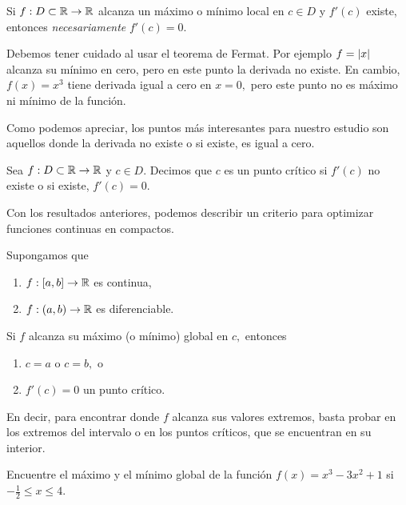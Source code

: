     \begin{thm}
        Si $f:D\subset \mathbb{R} \to \mathbb{R}$ alcanza un máximo o mínimo local en $c\in D$ y $f'(c)$ existe, entonces \emph{necesariamente}
        $f'(c)=0.$
    \end{thm}


    \begin{rem}
        Debemos tener cuidado al usar el teorema de Fermat. Por ejemplo $f=\left|x\right|$ alcanza su mínimo en cero, pero en este
        punto la derivada no existe. En cambio, $f(x)=x^{3}$ tiene derivada igual a cero en $x=0,$ pero este punto no es máximo
        ni mínimo de la función.
    \end{rem}


    Como podemos apreciar, los puntos más interesantes para nuestro estudio son aquellos donde la derivada no existe o si
    existe, es igual a cero.


    \begin{defn}
        Sea $f:D \subset \mathbb{R} \to \mathbb{R}$ y $c\in D.$ Decimos que $c$ es un punto crítico si $f'(c)$ no existe o si existe,
        $f'(c)=0.$
    \end{defn}


    Con los resultados anteriores, podemos describir un criterio para optimizar funciones continuas en compactos.


    \begin{prop}
        \label{opt:compacto}
        Supongamos que
        \begin{enumerate}
            \item $f:[a,b]\to \mathbb{R}$ es continua,
            \item $f:(a,b)\to \mathbb{R}$ es diferenciable.
        \end{enumerate}
        Si $f$ alcanza su máximo (o mínimo) global en $c,$ entonces
        \begin{enumerate}
            \item $c=a$ o $c=b,$ o
            \item $f'(c)=0$ un punto crítico.
        \end{enumerate}
    \end{prop}


    En decir, para encontrar donde $f$ alcanza sus valores extremos, basta probar en los extremos del intervalo o en los
    puntos críticos, que se encuentran en su interior.


    \begin{problema}
        Encuentre el máximo y el mínimo global de la función $f(x)=x^{3}-3x^{2}+1$ si $-\frac{1}{2}\leq x \leq 4.$
    \end{problema}

